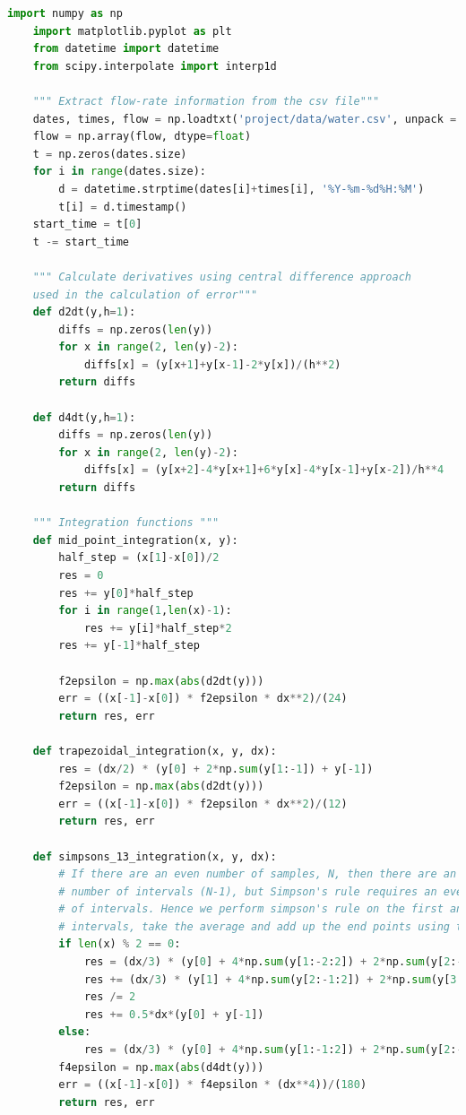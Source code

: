 \begin{lstlisting}[language=Python, caption=Code implementing different integration techniques and their associated errors]
    import numpy as np
    import matplotlib.pyplot as plt
    from datetime import datetime
    from scipy.interpolate import interp1d
    
    """ Extract flow-rate information from the csv file"""
    dates, times, flow = np.loadtxt('project/data/water.csv', unpack = True, usecols = (2, 3, 5), dtype=object)
    flow = np.array(flow, dtype=float)
    t = np.zeros(dates.size)
    for i in range(dates.size):
        d = datetime.strptime(dates[i]+times[i], '%Y-%m-%d%H:%M')
        t[i] = d.timestamp()
    start_time = t[0]
    t -= start_time
    
    """ Calculate derivatives using central difference approach 
    used in the calculation of error"""
    def d2dt(y,h=1):
        diffs = np.zeros(len(y))
        for x in range(2, len(y)-2):
            diffs[x] = (y[x+1]+y[x-1]-2*y[x])/(h**2)
        return diffs
    
    def d4dt(y,h=1):
        diffs = np.zeros(len(y))
        for x in range(2, len(y)-2):
            diffs[x] = (y[x+2]-4*y[x+1]+6*y[x]-4*y[x-1]+y[x-2])/h**4
        return diffs
    
    """ Integration functions """
    def mid_point_integration(x, y):
        half_step = (x[1]-x[0])/2
        res = 0
        res += y[0]*half_step
        for i in range(1,len(x)-1):
            res += y[i]*half_step*2
        res += y[-1]*half_step
    
        f2epsilon = np.max(abs(d2dt(y)))
        err = ((x[-1]-x[0]) * f2epsilon * dx**2)/(24)
        return res, err
    
    def trapezoidal_integration(x, y, dx):
        res = (dx/2) * (y[0] + 2*np.sum(y[1:-1]) + y[-1])
        f2epsilon = np.max(abs(d2dt(y)))
        err = ((x[-1]-x[0]) * f2epsilon * dx**2)/(12)
        return res, err
    
    def simpsons_13_integration(x, y, dx):
        # If there are an even number of samples, N, then there are an odd
        # number of intervals (N-1), but Simpson's rule requires an even number
        # of intervals. Hence we perform simpson's rule on the first and last (N-2)
        # intervals, take the average and add up the end points using trapezoidal rule
        if len(x) % 2 == 0:
            res = (dx/3) * (y[0] + 4*np.sum(y[1:-2:2]) + 2*np.sum(y[2:-2:2]) + y[-3])
            res += (dx/3) * (y[1] + 4*np.sum(y[2:-1:2]) + 2*np.sum(y[3:-1:2]) + y[-2])
            res /= 2
            res += 0.5*dx*(y[0] + y[-1])
        else:
            res = (dx/3) * (y[0] + 4*np.sum(y[1:-1:2]) + 2*np.sum(y[2:-1:2]) + y[-1])
        f4epsilon = np.max(abs(d4dt(y)))
        err = ((x[-1]-x[0]) * f4epsilon * (dx**4))/(180)
        return res, err
    

\end{lstlisting}
